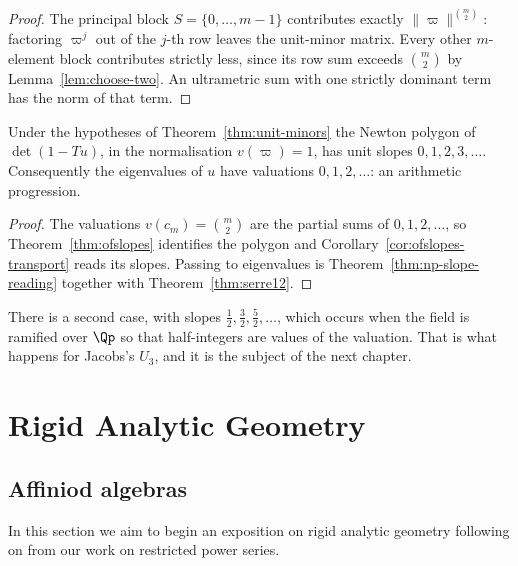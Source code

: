 \begin{proof}
  \leanok
  The principal block $S = \{0,\dots,m-1\}$ contributes exactly $\lVert\varpi\rVert^{\binom
  m2}$: factoring $\varpi^j$ out of the $j$-th row leaves the unit-minor matrix.  Every other
  $m$-element block contributes strictly less, since its row sum exceeds $\binom m2$ by
  Lemma~\ref{lem:choose-two}.  An ultrametric sum with one strictly dominant term has the norm of
  that term.
\end{proof}

\begin{corollary}
  \label{cor:slope-reading}
  \leanok
  Under the hypotheses of Theorem~\ref{thm:unit-minors} the Newton polygon of $\det(1-Tu)$, in
  the normalisation $v(\varpi) = 1$, has unit slopes $0, 1, 2, 3, \dots$.  Consequently the
  eigenvalues of $u$ have valuations $0, 1, 2, \dots$: an arithmetic progression.
\end{corollary}

\begin{proof}
  \leanok
  The valuations $v(c_m) = \binom m2$ are the partial sums of $0,1,2,\dots$, so
  Theorem~\ref{thm:ofslopes} identifies the polygon and
  Corollary~\ref{cor:ofslopes-transport} reads its slopes.  Passing to eigenvalues is
  Theorem~\ref{thm:np-slope-reading} together with Theorem~\ref{thm:serre12}.
\end{proof}

There is a second case, with slopes $\tfrac12, \tfrac32, \tfrac52, \dots$, which occurs when the
field is ramified over $\Qp$ so that half-integers are values of the valuation.  That is what
happens for Jacobs's $U_3$, and it is the subject of the next chapter.


\chapter{Rigid Analytic Geometry}

\section{Affiniod algebras}

In this section we aim to begin an exposition on rigid analytic geometry following on from our
work on restricted power series.

